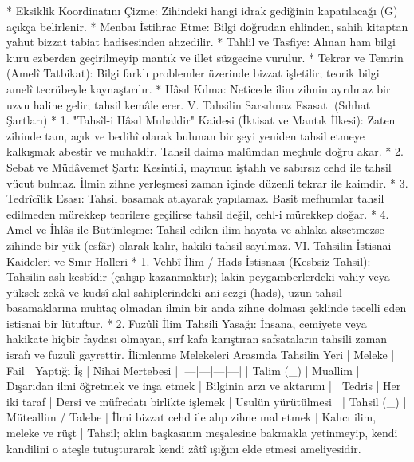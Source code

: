 \documentclass[11pt,a4paper]{article}
\begin{document}
 * Eksiklik Koordinatını Çizme: Zihindeki hangi idrak gediğinin kapatılacağı (G) açıkça belirlenir.
 * Menbaı İstihrac Etme: Bilgi doğrudan ehlinden, sahih kitaptan yahut bizzat tabiat hadisesinden ahzedilir.
 * Tahlil ve Tasfiye: Alınan ham bilgi kuru ezberden geçirilmeyip mantık ve illet süzgecine vurulur.
 * Tekrar ve Temrin (Amelî Tatbikat): Bilgi farklı problemler üzerinde bizzat işletilir; teorik bilgi amelî tecrübeyle kaynaştırılır.
 * Hâsıl Kılma: Neticede ilim zihnin ayrılmaz bir uzvu haline gelir; tahsil kemâle erer.
V. Tahsilin Sarsılmaz Esasatı (Sıhhat Şartları)
 * 1. "Tahsîl-i Hâsıl Muhaldir" Kaidesi (İktisat ve Mantık İlkesi):
   Zaten zihinde tam, açık ve bedihî olarak bulunan bir şeyi yeniden tahsil etmeye kalkışmak abestir ve muhaldir. Tahsil daima malûmdan meçhule doğru akar.
 * 2. Sebat ve Müdâvemet Şartı:
   Kesintili, maymun iştahlı ve sabırsız cehd ile tahsil vücut bulmaz. İlmin zihne yerleşmesi zaman içinde düzenli tekrar ile kaimdir.
 * 3. Tedrîcîlik Esası:
   Tahsil basamak atlayarak yapılamaz. Basit mefhumlar tahsil edilmeden mürekkep teorilere geçilirse tahsil değil, cehl-i mürekkep doğar.
 * 4. Amel ve İhlâs ile Bütünleşme:
   Tahsil edilen ilim hayata ve ahlaka aksetmezse zihinde bir yük (esfâr) olarak kalır, hakiki tahsil sayılmaz.
VI. Tahsilin İstisnai Kaideleri ve Sınır Halleri
 * 1. Vehbî İlim / Hads İstisnası (Kesbsiz Tahsil):
   Tahsilin aslı kesbîdir (çalışıp kazanmaktır); lakin peygamberlerdeki vahiy veya yüksek zekâ ve kudsî akıl sahiplerindeki ani sezgi (hads), uzun tahsil basamaklarına muhtaç olmadan ilmin bir anda zihne dolması şeklinde tecelli eden istisnai bir lütuftur.
 * 2. Fuzûlî İlim Tahsili Yasağı:
   İnsana, cemiyete veya hakikate hiçbir faydası olmayan, sırf kafa karıştıran safsataların tahsili zaman israfı ve fuzulî gayrettir.
İlimlenme Melekeleri Arasında Tahsilin Yeri
| Meleke | Fail | Yaptığı İş | Nihai Mertebesi |
|---|---|---|---|
| Talim (_{}) | Muallim | Dışarıdan ilmi öğretmek ve inşa etmek | Bilginin arzı ve aktarımı |
| Tedris | Her iki taraf | Dersi ve müfredatı birlikte işlemek | Usulün yürütülmesi |
| Tahsil (_{}) | Müteallim / Talebe | İlmi bizzat cehd ile alıp zihne mal etmek | Kalıcı ilim, meleke ve rüşt |
Tahsil; aklın başkasının meşalesine bakmakla yetinmeyip, kendi kandilini o ateşle tutuşturarak kendi zâtî ışığını elde etmesi ameliyesidir.
\end{document}

